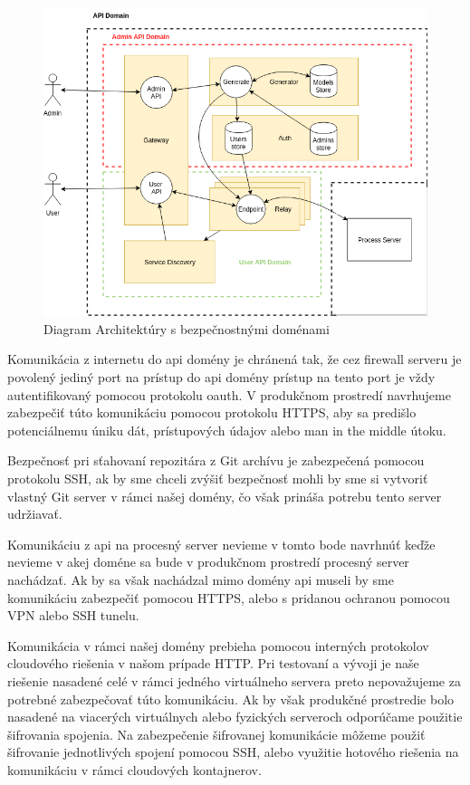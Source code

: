 \begin{figure}[!htbp]
	\centering
	\includegraphics[width=12cm]{img/threat_analysis.png}
	\caption{Diagram Architektúry s bezpečnostnými doménami}
	\label{threat_analysis}
\end{figure}

Komunikácia z internetu do \acrshort{api} domény je chránená tak, že cez firewall serveru je povolený jediný port na prístup do \acrshort{api} domény prístup na tento port je vždy autentifikovaný pomocou protokolu \acrshort{oauth}. V produkčnom prostredí navrhujeme zabezpečiť túto komunikáciu pomocou protokolu HTTPS, aby sa predišlo potenciálnemu úniku dát, prístupových údajov alebo man in the middle útoku. 

Bezpečnosť pri sťahovaní repozitára z Git archívu je zabezpečená pomocou protokolu SSH, ak by sme chceli zvýšiť bezpečnosť mohli by sme si vytvoriť vlastný Git server v rámci našej domény, čo však prináša potrebu tento server udržiavať.

Komunikáciu z \acrshort{api} na procesný server nevieme v tomto bode navrhnúť keďže nevieme v akej doméne sa bude v produkčnom prostredí procesný server nachádzať. Ak by sa však nachádzal mimo domény \acrshort{api} museli by sme komunikáciu zabezpečiť pomocou HTTPS, alebo s pridanou ochranou pomocou VPN alebo SSH tunelu.

Komunikácia v rámci našej domény prebieha pomocou interných protokolov cloudového riešenia v našom prípade HTTP.  Pri testovaní a vývoji je naše riešenie nasadené celé v rámci jedného virtuálneho servera preto nepovažujeme za potrebné zabezpečovať túto komunikáciu. Ak by však produkčné prostredie bolo nasadené na viacerých virtuálnych alebo fyzických serveroch odporúčame použitie šifrovania spojenia. Na zabezpečenie šifrovanej komunikácie môžeme použiť šifrovanie jednotlivých spojení pomocou SSH, alebo využitie hotového riešenia na komunikáciu v rámci cloudových kontajnerov.

